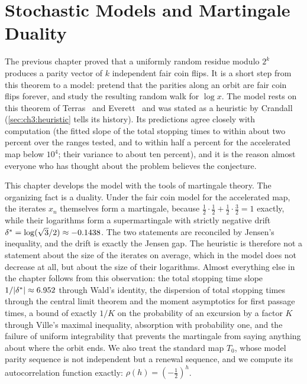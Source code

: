 \chapter{Stochastic Models and Martingale Duality}\label{chap:stochastic}

The previous chapter proved that a uniformly random residue modulo $2^k$
produces a parity vector of $k$ independent fair coin flips. It is a short
step from this theorem to a model: pretend that the parities along an orbit
are fair coin flips forever, and study the resulting random walk for $\log x$.
The model rests on this theorem of Terras~\cite{terras1976} and Everett~\cite{everett1977} and was stated as a heuristic by Crandall~\cite{crandall1978} (\cref{sec:ch3:heuristic} tells its history).
Its predictions agree closely with computation (the fitted slope of the total stopping times to within about two percent over the ranges tested, and to within half a percent for the accelerated map below $10^4$; their variance to about ten percent), and it is the reason almost everyone who has thought about the problem believes the conjecture.

This chapter develops the model with the tools of martingale theory. The
organizing fact is a duality. Under the fair coin model for the accelerated
map, the iterates $x_n$ themselves form a martingale, because
$\tfrac12\cdot\tfrac12+\tfrac12\cdot\tfrac32=1$ exactly, while their
logarithms form a supermartingale with strictly negative drift
$\delta^{*}=\log(\sqrt3/2)\approx-0.1438$. The two statements are reconciled by
Jensen's inequality, and the drift is exactly the Jensen gap.
The heuristic is therefore not a statement about the size of the iterates on average, which in the model does not decrease at all, but about the size of their logarithms.
Almost everything else in the chapter follows from this observation: the total stopping
time slope $1/|\delta^{*}|\approx6.952$ through Wald's identity, the dispersion of
total stopping times through the central limit theorem and the moment asymptotics for first passage times, a
bound of exactly $1/K$ on the probability of an excursion by a factor $K$
through Ville's maximal inequality, absorption with probability one, and the
failure of uniform integrability that prevents the martingale from saying
anything about where the orbit ends. We also treat the standard map $T_0$,
whose model parity sequence is not independent but a renewal sequence, and we
compute its autocorrelation function exactly: $\rho(h)=(-\tfrac12)^h$.

